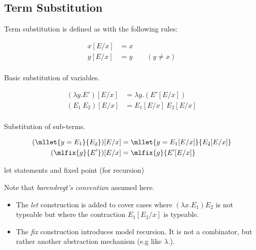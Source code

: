 \subsection{Term Substitution}
Term substitution is defined as with the following rules:
\\ \begin{minipage}[t]{.5\textwidth}
    \[\begin{split}
        x[E/x] &= x \\
        y[E/x] &= y \qquad (y \neq x) \\
    \end{split}\]
    \centerline{Basic substitution of variables.}
\end{minipage}
\begin{minipage}[t]{.5\textwidth}
    \[\begin{split}
        (\lambda y . E')[E/x] &= \lambda y.(E'[E/x]) \\
        (E_1 \ E_2)[E/x] &= E_1[E/x] \ E_2[E/x] \\
    \end{split}\]
    \centerline{Substitution of sub-terms.}
\end{minipage}
\vspace{5mm}
\[\begin{split}
    (\mllet{y = E_1}{E_2})[E/x] &= \mllet{y = E_1[E/x]}{E_2[E/x]} \\
    (\mlfix{g}{E'})[E/x] &= \mlfix{g}{E'[E/x]} \\
\end{split}\]
\centerline{let statements and fixed point (for recursion)}
Note that \textit{barendregt's convention} assumed here.
\begin{itemize}
    \item The \textit{let} construction is added to cover cases where $(\lambda x . E_1) E_2$ is not typeable but where the contraction $E_1[E_2/x]$ is typeable.
    \item The \textit{fix} construction introduces model recursion. It is not a combinator, but rather another abstraction mechanism (e.g like $\lambda . $).
\end{itemize}

